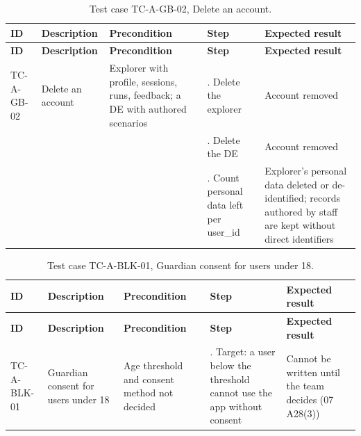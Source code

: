 {\small
\begin{longtable}{|>{\raggedright\arraybackslash}p{}|>{\raggedright\arraybackslash}p{}|>{\raggedright\arraybackslash}p{}|>{\raggedright\arraybackslash}p{}|>{\raggedright\arraybackslash}p{}|}
\caption{Test case TC-A-GB-02, Delete an account.} \\
\hline
\textbf{ID} & \textbf{Description} & \textbf{Precondition} & \textbf{Step} & \textbf{Expected result} \\ \hline
\endfirsthead
\hline
\textbf{ID} & \textbf{Description} & \textbf{Precondition} & \textbf{Step} & \textbf{Expected result} \\ \hline
\endhead
TC-A-GB-02 & Delete an account & Explorer with profile, sessions, runs, feedback; a DE with authored scenarios & 1. Delete the explorer & Account removed \\ \hline
 &  &  & 2. Delete the DE & Account removed \\ \hline
 &  &  & 3. Count personal data left per user\_id & Explorer's personal data deleted or de-identified; records authored by staff are kept without direct identifiers \\ \hline
\end{longtable}
}

{\small
\begin{longtable}{|>{\raggedright\arraybackslash}p{}|>{\raggedright\arraybackslash}p{}|>{\raggedright\arraybackslash}p{}|>{\raggedright\arraybackslash}p{}|>{\raggedright\arraybackslash}p{}|}
\caption{Test case TC-A-BLK-01, Guardian consent for users under 18.} \\
\hline
\textbf{ID} & \textbf{Description} & \textbf{Precondition} & \textbf{Step} & \textbf{Expected result} \\ \hline
\endfirsthead
\hline
\textbf{ID} & \textbf{Description} & \textbf{Precondition} & \textbf{Step} & \textbf{Expected result} \\ \hline
\endhead
TC-A-BLK-01 & Guardian consent for users under 18 & Age threshold and consent method not decided & 1. Target: a user below the threshold cannot use the app without consent & Cannot be written until the team decides (07 A28(3)) \\ \hline
\end{longtable}
}

